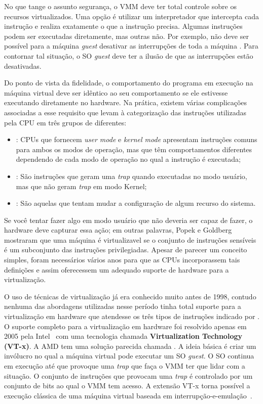 No que tange o assunto segurança, o VMM deve ter total controle sobre os
recursos virtualizados. Uma opção é utilizar um interpretador que intercepta
cada instrução e realiza exatamente o que a instrução precisa. Algumas
instruções podem ser executadas diretamente, mas outras não. Por exemplo, não
deve ser possível para a máquina \emph{guest} desativar as interrupções de toda
a máquina \citep{tanenbaum}. Para contornar tal situação, o SO \emph{guest}
deve ter a ilusão de que as interrupções estão desativadas.

Do ponto de vista da fidelidade, o comportamento do programa em execução na
máquina virtual deve ser idêntico ao seu comportamento se ele estivesse executando
diretamente no hardware. Na prática, existem várias complicações associadas a
esse requisito que levam à categorização das instruções utilizadas pela CPU em
três grupos de diferentes:

\begin{itemize}
  \item {}: CPUs que fornecem \emph{user mode} e
        \emph{kernel mode} apresentam instruções comuns para ambos os modos de
        operação, mas que têm comportamentos diferentes dependendo de cada modo
        de operação no qual a instrução é executada;
  \item {}: São instruções que geram uma
        \emph{trap} quando executadas no modo usuário, mas que não geram
        \emph{trap} em modo Kernel;
  \item {}: São aquelas que
        tentam mudar a configuração de algum recurso do sistema.
\end{itemize}

Se você tentar fazer algo em modo usuário que não deveria ser capaz de
fazer, o hardware deve capturar essa ação; em outras palavras, Popek e Goldberg
mostraram que uma máquina é virtualizavel se o conjunto de instruções sensíveis
é um subconjunto das instruções privilegiadas. Apesar de parecer um conceito
simples, foram necessários vários anos para que as CPUs incorporassem tais definições
e assim oferecessem um adequado suporte de hardware para a virtualização.

O uso de técnicas de virtualização já era conhecido muito antes de 1998,
contudo nenhuma das abordagens utilizadas nesse período tinha total suporte
para a virtualização em hardware que atendesse os três tipos de instruções
indicado por \citet{popek}. O suporte completo para a virtualização em hardware
foi resolvido apenas em 2005 pela Intel~\citep{uhlig} com uma tecnologia
chamada \textbf{Virtualization Technology (VT-x)}. A AMD tem uma
solução parecida chamada . A ideia
básica é criar um invólucro no qual a máquina virtual pode executar um SO
\emph{guest}.  O SO continua em execução até que provoque uma \emph{trap} que
faça o VMM ter que lidar com a situação. O conjunto de instruções que provocam
uma \emph{trap} é controlado por um conjunto de bits ao qual o VMM tem acesso.
A extensão VT-x torna possível a execução clássica de uma máquina virtual
baseada em interrupção-e-emulação~\citep{tanenbaum}.

